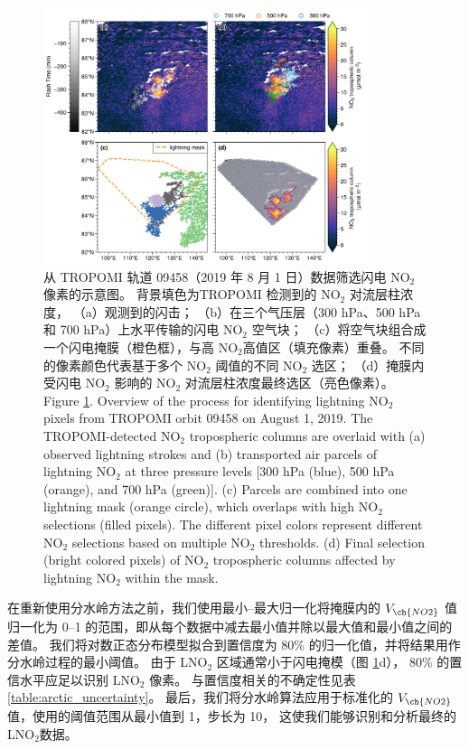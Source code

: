 \begin{figure}[H]
\centering
\includegraphics[width=0.85\textwidth]{./figures/arctic_workflow.png}
\caption{
从 TROPOMI 轨道 09458（2019 年 8 月 1 日）数据筛选闪电 NO$_2$ 像素的示意图。
背景填色为TROPOMI 检测到的 NO$_2$ 对流层柱浓度，
（a）观测到的闪击；
（b）在三个气压层（300 hPa、500 hPa 和 700 hPa）上水平传输的闪电 NO$_2$ 空气块；
（c）将空气块组合成一个闪电掩膜（橙色框），与高 NO$_2$高值区（填充像素）重叠。
不同的像素颜色代表基于多个 NO$_2$ 阈值的不同 NO$_2$ 选区；
（d）掩膜内受闪电 NO$_2$ 影响的 NO$_2$ 对流层柱浓度最终选区（亮色像素）。\\
Figure \ref{fig:workflow}. Overview of the process for identifying lightning NO$_2$ pixels from TROPOMI orbit 09458 on August 1, 2019.
The TROPOMI-detected NO$_2$ tropospheric columns are overlaid with (a) observed lightning strokes and
(b) transported air parcels of lightning NO$_2$ at three pressure levels [300 hPa (blue), 500 hPa (orange), and 700 hPa (green)].
(c) Parcels are combined into one lightning mask (orange circle), which overlaps with high NO$_2$ selections (filled pixels). The different pixel colors represent different NO$_2$ selections based on multiple NO$_2$ thresholds.
(d) Final selection (bright colored pixels) of NO$_2$ tropospheric columns affected by lightning NO$_2$ within the mask.
}
\label{fig:workflow}
\end{figure}

在重新使用分水岭方法之前，我们使用最小--最大归一化将掩膜内的 $V_{\ch{NO2}}$ 值归一化为 0--1 的范围，即从每个数据中减去最小值并除以最大值和最小值之间的差值。
我们将对数正态分布模型拟合到置信度为 80\% 的归一化值，并将结果用作分水岭过程的最小阈值。
由于 LNO$_2$ 区域通常小于闪电掩模（图 \ref{fig:workflow}d），
80\% 的置信水平应足以识别 LNO$_2$ 像素。
与置信度相关的不确定性见表 \ref{table:arctic_uncertainty}。
最后，我们将分水岭算法应用于标准化的 $V_{\ch{NO2}}$ 值，使用的阈值范围从最小值到 1，步长为 10，
这使我们能够识别和分析最终的LNO$_2$数据。


